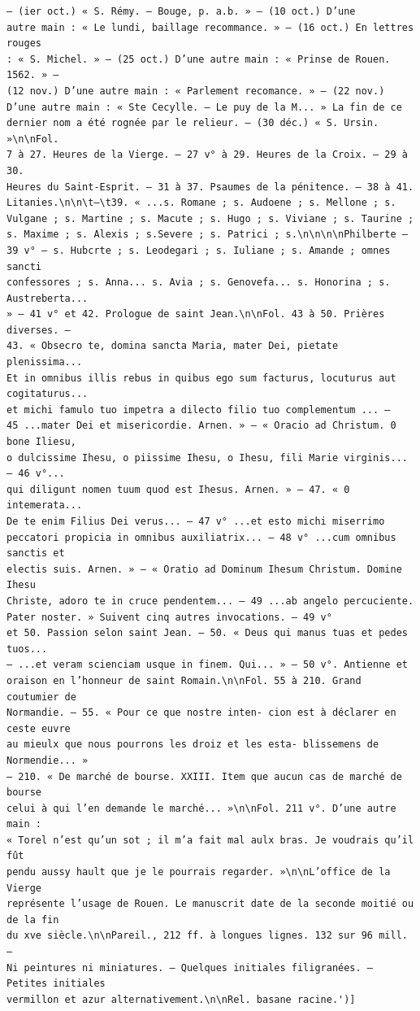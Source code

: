 \documentclass[a4paper,12pt,twoside]{book}
\begin{document}
\begin{verbatim}
— (ier oct.) « S. Rémy. — Bouge, p. a.b. » — (10 oct.) D’une 
autre main : « Le lundi, baillage recommance. » — (16 oct.) En lettres rouges 
: « S. Michel. » — (25 oct.) D’une autre main : « Prinse de Rouen. 1562. » — 
(12 nov.) D’une autre main : « Parlement recomance. » — (22 nov.) 
D’une autre main : « Ste Cecylle. — Le puy de la M... » La fin de ce 
dernier nom a été rognée par le relieur. — (30 déc.) « S. Ursin. »\n\nFol. 
7 à 27. Heures de la Vierge. — 27 v° à 29. Heures de la Croix. — 29 à 30.
Heures du Saint-Esprit. — 31 à 37. Psaumes de la pénitence. — 38 à 41. 
Litanies.\n\n\t—\t39. « ...s. Romane ; s. Audoene ; s. Mellone ; s.
Vulgane ; s. Martine ; s. Macute ; s. Hugo ; s. Viviane ; s. Taurine ; 
s. Maxime ; s. Alexis ; s.Severe ; s. Patrici ; s.\n\n\n\nPhilberte — 
39 v° — s. Hubcrte ; s. Leodegari ; s. Iuliane ; s. Amande ; omnes sancti 
confessores ; s. Anna... s. Avia ; s. Genovefa... s. Honorina ; s. Austreberta...
» — 41 v° et 42. Prologue de saint Jean.\n\nFol. 43 à 50. Prières diverses. —
43. « Obsecro te, domina sancta Maria, mater Dei, pietate plenissima... 
Et in omnibus illis rebus in quibus ego sum facturus, locuturus aut cogitaturus...
et michi famulo tuo impetra a dilecto filio tuo complementum ... — 
45 ...mater Dei et misericordie. Arnen. » — « Oracio ad Christum. 0 bone Iliesu,
o dulcissime Ihesu, o piissime Ihesu, o Ihesu, fili Marie virginis... — 46 v°... 
qui diligunt nomen tuum quod est Ihesus. Arnen. » — 47. « 0 intemerata... 
De te enim Filius Dei verus... — 47 v° ...et esto michi miserrimo 
peccatori propicia in omnibus auxiliatrix... — 48 v° ...cum omnibus sanctis et
electis suis. Arnen. » — « Oratio ad Dominum Ihesum Christum. Domine Ihesu 
Christe, adoro te in cruce pendentem... — 49 ...ab angelo percuciente. 
Pater noster. » Suivent cinq autres invocations. — 49 v°
et 50. Passion selon saint Jean. — 50. « Deus qui manus tuas et pedes tuos... 
— ...et veram scienciam usque in finem. Qui... » — 50 v°. Antienne et 
oraison en l’honneur de saint Romain.\n\nFol. 55 à 210. Grand coutumier de
Normandie. — 55. « Pour ce que nostre inten- cion est à déclarer en ceste euvre 
au mieulx que nous pourrons les droiz et les esta- blissemens de Normendie... » 
— 210. « De marché de bourse. XXIII. Item que aucun cas de marché de bourse 
celui à qui l’en demande le marché... »\n\nFol. 211 v°. D’une autre main : 
« Torel n’est qu’un sot ; il m’a fait mal aulx bras. Je voudrais qu’il fût
pendu aussy hault que je le pourrais regarder. »\n\nL’office de la Vierge 
représente l’usage de Rouen. Le manuscrit date de la seconde moitié ou de la fin
du xve siècle.\n\nPareil., 212 ff. à longues lignes. 132 sur 96 mill. — 
Ni peintures ni miniatures. — Quelques initiales filigranées. — Petites initiales 
vermillon et azur alternativement.\n\nRel. basane racine.')]
\end{verbatim}
\end{document}
